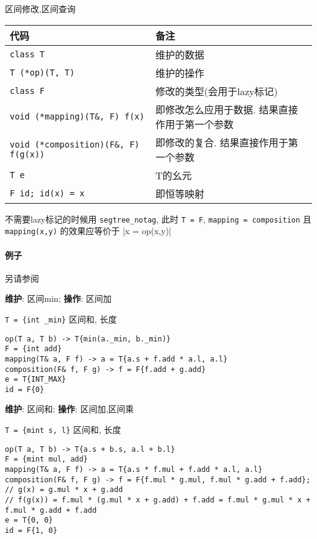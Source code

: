 区间修改,区间查询

\begin{tabular}{ll}
    \hline
    代码                                        & 备注                       \\
    \hline
    \verb|class T|                            & 维护的数据                    \\
    \verb|T (*op)(T, T)|                      & 维护的操作                    \\
    \verb|class F|                            & 修改的类型(会用于lazy标记)         \\
    \verb|void (*mapping)(T&, F) f(x)|        & 即修改怎么应用于数据. 结果直接作用于第一个参数 \\
    \verb|void (*composition)(F&, F) f(g(x))| & 即修改的复合. 结果直接作用于第一个参数     \\
    \verb|T e|                                & T的幺元                     \\
    \verb|F id; id(x) = x|                    & 即恒等映射                    \\
    \hline
\end{tabular}

不需要lazy标记的时候用 \verb|segtree_notag|, 此时 \verb|T = F|, \verb|mapping = composition| 且 \verb|mapping(x,y)| 的效果应等价于 |x = op(x,y)|

\paragraph{例子}

另请参阅 

\textbf{维护}: 区间min; \textbf{操作}: 区间加

\verb|T = {int _min}| 区间和, 长度

\begin{verbatim}
op(T a, T b) -> T{min(a._min, b._min)}
F = {int add}
mapping(T& a, F f) -> a = T{a.s + f.add * a.l, a.l}
composition(F& f, F g) -> f = F{f.add + g.add}
e = T{INT_MAX}
id = F{0}
\end{verbatim}

\textbf{维护}: 区间和; \textbf{操作}: 区间加,区间乘

\verb|T = {mint s, l}| 区间和, 长度

\begin{verbatim}
op(T a, T b) -> T{a.s + b.s, a.l + b.l}
F = {mint mul, add}
mapping(T& a, F f) -> a = T{a.s * f.mul + f.add * a.l, a.l}
composition(F& f, F g) -> f = F{f.mul * g.mul, f.mul * g.add + f.add};
// g(x) = g.mul * x + g.add
// f(g(x)) = f.mul * (g.mul * x + g.add) + f.add = f.mul * g.mul * x + f.mul * g.add + f.add
e = T{0, 0}
id = F{1, 0}
\end{verbatim}
